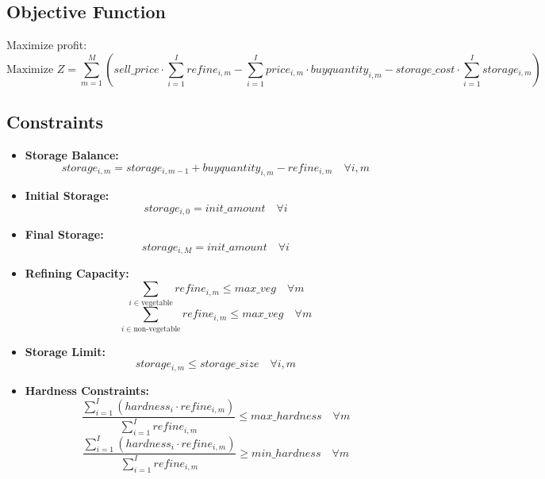 \documentclass{article}
\begin{document}
\subsection*{Objective Function}
Maximize profit:
\[
\text{Maximize } Z = \sum_{m=1}^{M} \left(sell\_price \cdot \sum_{i=1}^{I} refine_{i,m} - \sum_{i=1}^{I} price_{i,m} \cdot buyquantity_{i,m} - storage\_cost \cdot \sum_{i=1}^{I} storage_{i,m}\right)
\]

\subsection*{Constraints}
\begin{itemize}

    \item \textbf{Storage Balance:}
    \[
    storage_{i,m} = storage_{i,m-1} + buyquantity_{i,m} - refine_{i,m} \quad \forall i, m
    \]
    
    \item \textbf{Initial Storage:}
    \[
    storage_{i,0} = init\_amount \quad \forall i
    \]

    \item \textbf{Final Storage:}
    \[
    storage_{i,M} = init\_amount \quad \forall i
    \]

    \item \textbf{Refining Capacity:}
    \[
    \sum_{i \in \text{vegetable}} refine_{i,m} \leq max\_veg \quad \forall m
    \]
    \[
    \sum_{i \in \text{non-vegetable}} refine_{i,m} \leq max\_veg \quad \forall m
    \]

    \item \textbf{Storage Limit:}
    \[
    storage_{i,m} \leq storage\_size \quad \forall i, m
    \]

    \item \textbf{Hardness Constraints:}
    \[
    \frac{\sum_{i=1}^{I} (hardness_{i} \cdot refine_{i,m})}{\sum_{i=1}^{I} refine_{i,m}} \leq max\_hardness \quad \forall m
    \]
    \[
    \frac{\sum_{i=1}^{I} (hardness_{i} \cdot refine_{i,m})}{\sum_{i=1}^{I} refine_{i,m}} \geq min\_hardness \quad \forall m
    \]
    
\end{itemize}
\end{document}
